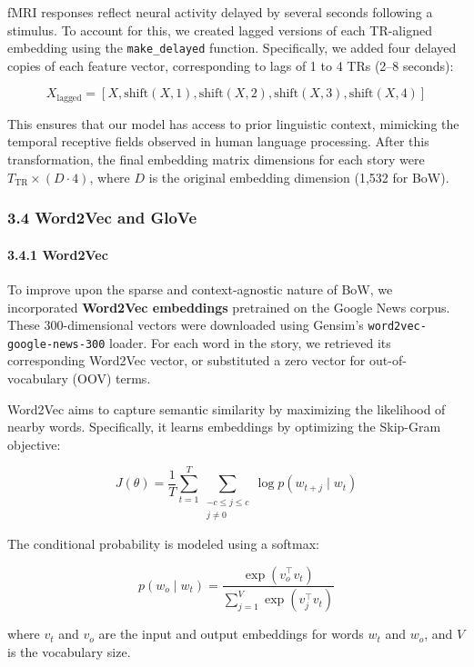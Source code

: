 \documentclass[11pt]{article}
\begin{document}
fMRI responses reflect neural activity delayed by several seconds
following a stimulus. To account for this, we created lagged versions of
each TR-aligned embedding using the \texttt{make\_delayed} function.
Specifically, we added four delayed copies of each feature vector,
corresponding to lags of 1 to 4 TRs (2--8 seconds):

\[
X_{\text{lagged}} = \left[ X, \text{shift}(X, 1), \text{shift}(X, 2), \text{shift}(X, 3), \text{shift}(X, 4) \right]
\]

This ensures that our model has access to prior linguistic context,
mimicking the temporal receptive fields observed in human language
processing. After this transformation, the final embedding matrix
dimensions for each story were \(T_{\text{TR}} \times (D \cdot 4)\),
where \(D\) is the original embedding dimension (1,532 for BoW).

\hypertarget{word2vec-and-glove}{%
\subsubsection{3.4 Word2Vec and GloVe}\label{word2vec-and-glove}}

\hypertarget{word2vec}{%
\paragraph{3.4.1 Word2Vec}\label{word2vec}}

To improve upon the sparse and context-agnostic nature of BoW, we
incorporated \textbf{Word2Vec embeddings} pretrained on the Google News
corpus. These 300-dimensional vectors were downloaded using Gensim's
\texttt{word2vec-google-news-300} loader. For each word in the story, we
retrieved its corresponding Word2Vec vector, or substituted a zero
vector for out-of-vocabulary (OOV) terms.

Word2Vec aims to capture semantic similarity by maximizing the
likelihood of nearby words. Specifically, it learns embeddings by
optimizing the Skip-Gram objective:

\[
J(\theta) = \frac{1}{T} \sum_{t=1}^{T} \sum_{\substack{-c \leq j \leq c \\ j \neq 0}} \log p(w_{t+j} \mid w_t)
\]

The conditional probability is modeled using a softmax:

\[
p(w_o \mid w_t) = \frac{\exp(v_o^\top v_t)}{\sum_{j=1}^{V} \exp(v_j^\top v_t)}
\]

where \(v_t\) and \(v_o\) are the input and output embeddings for words
\(w_t\) and \(w_o\), and \(V\) is the vocabulary size.
\end{document}
